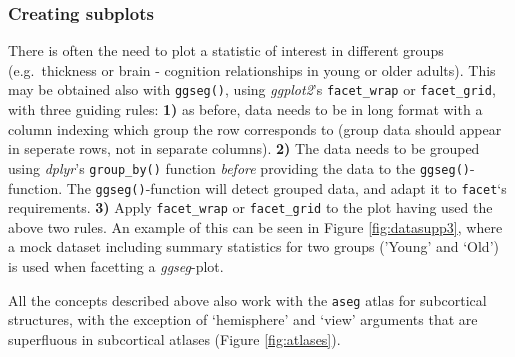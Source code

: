 \documentclass[fleqn,10pt]{wlpeerj} %
\begin{document}
\hypertarget{creating-subplots}{%
\subsubsection{Creating subplots}\label{creating-subplots}}

There is often the need to plot a statistic of interest in different groups (e.g.~thickness or brain - cognition relationships in young or older adults).
This may be obtained also with \texttt{ggseg()}, using \emph{ggplot2}'s \texttt{facet\_wrap} or \texttt{facet\_grid}, with three guiding rules:
\textbf{1)} as before, data needs to be in long format with a column indexing which group the row corresponds to (group data should appear in seperate rows, not in separate columns).
\textbf{2)} The data needs to be grouped using \emph{dplyr}'s \texttt{group\_by()} function \emph{before} providing the data to the \texttt{ggseg()}-function.
The \texttt{ggseg()}-function will detect grouped data, and adapt it to \texttt{facet}`s requirements.
\textbf{3)} Apply \texttt{facet\_wrap} or \texttt{facet\_grid} to the plot having used the above two rules.
An example of this can be seen in Figure \ref{fig:datasupp3}, where a mock dataset including summary statistics for two groups ('Young' and `Old') is used when facetting a \emph{ggseg}-plot.

All the concepts described above also work with the \texttt{aseg} atlas for subcortical structures, with the exception of `hemisphere' and `view' arguments that are superfluous in subcortical atlases (Figure \ref{fig:atlases}).
\end{document}
